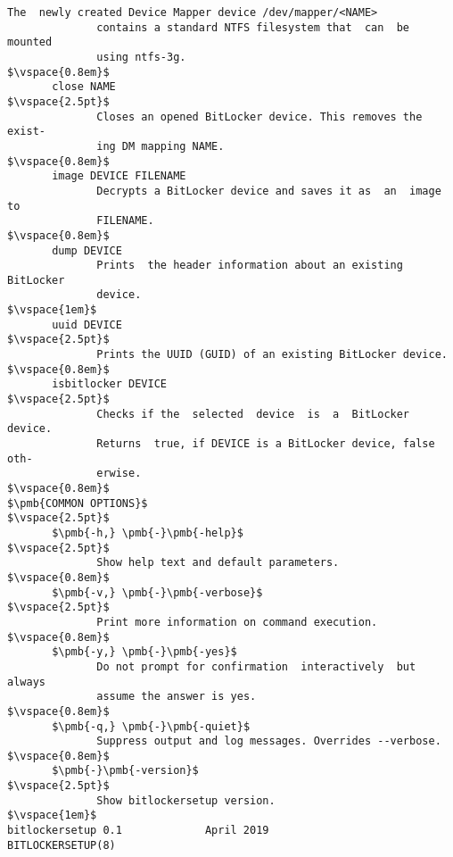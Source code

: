 \begin{lstlisting}[frame=none, escapechar=$, columns=fullflexible, keepspaces=true, basicstyle=\ttfamily\small]
              The  newly created Device Mapper device /dev/mapper/<NAME>
              contains a standard NTFS filesystem that  can  be  mounted
              using ntfs-3g.
$\vspace{0.8em}$
       close NAME
$\vspace{2.5pt}$
              Closes an opened BitLocker device. This removes the exist-
              ing DM mapping NAME.
$\vspace{0.8em}$
       image DEVICE FILENAME
              Decrypts a BitLocker device and saves it as  an  image  to
              FILENAME.
$\vspace{0.8em}$
       dump DEVICE
              Prints  the header information about an existing BitLocker
              device.
$\vspace{1em}$
       uuid DEVICE
$\vspace{2.5pt}$
              Prints the UUID (GUID) of an existing BitLocker device.
$\vspace{0.8em}$
       isbitlocker DEVICE
$\vspace{2.5pt}$
              Checks if the  selected  device  is  a  BitLocker  device.
              Returns  true, if DEVICE is a BitLocker device, false oth-
              erwise.
$\vspace{0.8em}$
$\pmb{COMMON OPTIONS}$
$\vspace{2.5pt}$
       $\pmb{-h,} \pmb{-}\pmb{-help}$
$\vspace{2.5pt}$
              Show help text and default parameters.
$\vspace{0.8em}$
       $\pmb{-v,} \pmb{-}\pmb{-verbose}$
$\vspace{2.5pt}$
              Print more information on command execution.
$\vspace{0.8em}$
       $\pmb{-y,} \pmb{-}\pmb{-yes}$
              Do not prompt for confirmation  interactively  but  always
              assume the answer is yes.
$\vspace{0.8em}$
       $\pmb{-q,} \pmb{-}\pmb{-quiet}$
              Suppress output and log messages. Overrides --verbose.
$\vspace{0.8em}$
       $\pmb{-}\pmb{-version}$
$\vspace{2.5pt}$
              Show bitlockersetup version.
$\vspace{1em}$
bitlockersetup 0.1             April 2019              BITLOCKERSETUP(8)
\end{lstlisting}

\label{attachment:sources}


